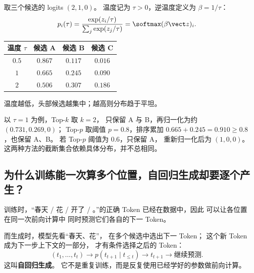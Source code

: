 取三个候选的 logits $(2,1,0)$。
温度记为 $\tau>0$，逆温度定义为 $\beta=1/\tau$：
\[
p_i(\tau)=\frac{\exp(z_i/\tau)}{\sum_j\exp(z_j/\tau)}
=\softmax(\beta\vect z)_i.
\]
\begin{center}\small
{}
\begin{tabular}{@{}cccc@{}}\toprule
温度 $\tau$ & 候选 A & 候选 B & 候选 C\\\midrule
$0.5$ & $0.867$ & $0.117$ & $0.016$\\
$1$ & $0.665$ & $0.245$ & $0.090$\\
$2$ & $0.506$ & $0.307$ & $0.186$\\\bottomrule
\end{tabular}
\end{center}
温度越低，头部候选越集中；越高则分布趋于平坦。

以 $\tau=1$ 为例，Top-$k$ 取 $k=2$，
只保留 A 与 B，再归一化为约 $(0.731,0.269,0)$；
Top-$p$ 取阈值 $p=0.8$，排序累加
$0.665+0.245=0.910\ge0.8$，也保留 A、B。
若 Top-$p$ 阈值为 $0.6$，只保留 A，
重新归一化后为 $(1,0,0)$。
这两种方法的截断集合依赖具体分布，并不总相同。

\subsection{为什么训练能一次算多个位置，自回归生成却要逐个产生？}
\label{concept:autoregressive}

训练时，“春天 / 花 / 开了 / 。”的正确 Token
已经在数据中，因此  可以让各位置在同一次前向计算中
同时预测它们各自的下一 Token。

而生成时，模型先看“春天、花”，
在多个候选中选出下一 Token；
这个新 Token 成为下一步上下文的一部分，
才有条件选择之后的 Token：
\[
(t_1,\ldots,t_t)
\longrightarrow p(t_{t+1}\mid t_{\le t})
\longrightarrow t_{t+1}
\longrightarrow\text{继续预测}.
\]
这叫\textbf{自回归生成}。
它不是重复训练，而是反复使用已经学好的参数做前向计算。

